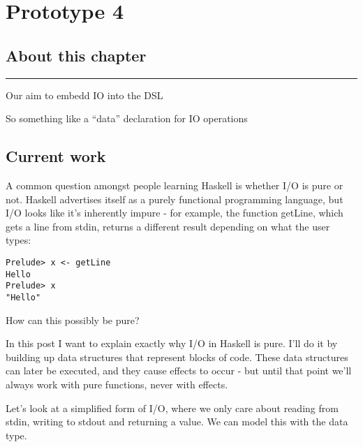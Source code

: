 \documentclass[thesis-solanki.tex]{subfiles}
\begin{document}
\chapter{Prototype 4}{\label{proto4}}


\section{About this chapter}

\noindent\rule{\textwidth}{0.5pt}

Our aim to embedd IO into the DSL

So something like a ``data'' declaration for IO operations

\section{Current work}

\cite{website:ioispurechristaylor}

A common question amongst people learning Haskell is whether I/O is pure or not. Haskell advertises itself as a purely functional 
programming language, but I/O looks like it's inherently impure - for example, the function getLine, which gets a line from stdin, returns 
a different result depending on what the user types:



\begin{code-list}[H]
\begin{singlespace}
\begin{verbatim}
Prelude> x <- getLine
Hello
Prelude> x
"Hello"
\end{verbatim}
\end{singlespace}
\caption{}
\label{}
\end{code-list}
How can this possibly be pure?

In this post I want to explain exactly why I/O in Haskell is pure. I'll do it by building up data structures that represent blocks of code. 
These data structures can later be executed, and they cause effects to occur - but until that point we'll always work with pure functions, 
never with effects.

Let's look at a simplified form of I/O, where we only care about reading from stdin, writing to stdout and returning a value. We can model 
this with the  data type.
\end{document}
